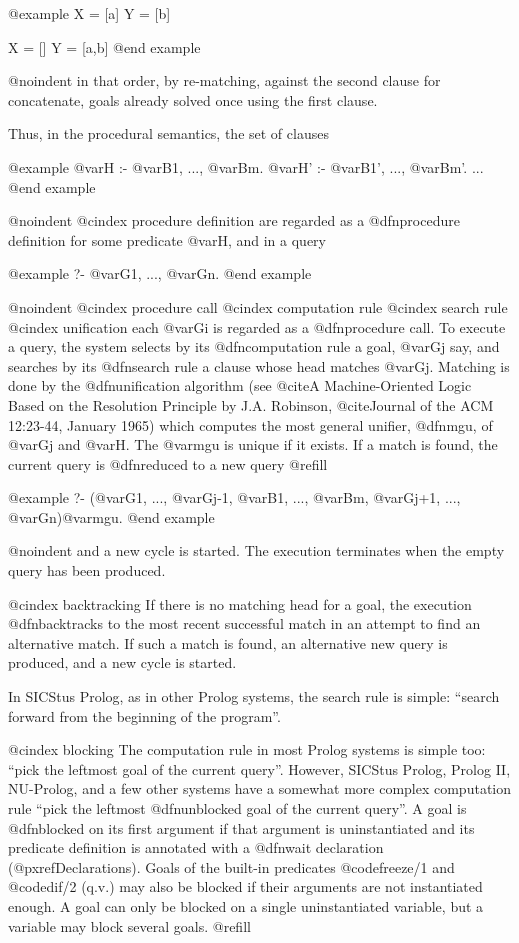{@example
X = [a]
Y = [b]

X = []
Y = [a,b]
@end example

@noindent
in that order, by re-matching, against the second clause for concatenate,
goals already solved once using the first clause.

Thus, in the procedural semantics, the set of clauses

@example
@var{H} :- @var{B1}, ..., @var{Bm}.
@var{H'} :- @var{B1'}, ..., @var{Bm'}.
...
@end example

@noindent
@cindex procedure definition
are regarded as a @dfn{procedure definition} for some predicate @var{H},
and in a query

@example
?- @var{G1}, ..., @var{Gn}.
@end example

@noindent
@cindex procedure call
@cindex computation rule
@cindex search rule
@cindex unification
each @var{Gi} is regarded as a @dfn{procedure call}.  To execute a
query, the system selects by its @dfn{computation rule} a goal, @var{Gj}
say, and searches by its @dfn{search rule} a clause whose head matches
@var{Gj}.  Matching is done by the @dfn{unification} algorithm (see
@cite{A Machine-Oriented Logic Based on the Resolution Principle} by
J.A. Robinson, @cite{Journal of the ACM} 12:23-44, January 1965) which
computes the most general unifier, @dfn{mgu}, of @var{Gj} and @var{H}.
The @var{mgu} is unique if it exists.  If a match is found, the current
query is @dfn{reduced} to a new query @refill

@example
?- (@var{G1}, ..., @var{Gj-1}, @var{B1}, ..., @var{Bm}, @var{Gj+1}, ..., @var{Gn})@var{mgu}.
@end example

@noindent
and a new cycle is started.  The execution terminates when the empty
query has been produced.

@cindex backtracking
If there is no matching head for a goal, the execution @dfn{backtracks}
to the most recent successful match in an attempt to find an alternative
match.  If such a match is found, an alternative new query is produced,
and a new cycle is started.

In SICStus Prolog, as in other Prolog systems, the search rule is
simple: ``search forward from the beginning of the program''.  

@cindex blocking
The computation rule in most Prolog systems is simple too: ``pick the
leftmost goal of the current query''.  However, SICStus Prolog, Prolog
II, NU-Prolog, and a few other systems have a somewhat more complex
computation rule ``pick the leftmost @dfn{unblocked} goal of the current
query''.  A goal is @dfn{blocked on its first argument} if that argument
is uninstantiated and its predicate definition is annotated with a
@dfn{wait declaration} (@pxref{Declarations}).  Goals of the built-in
predicates @code{freeze/1} and @code{dif/2} (q.v.) may also be blocked
if their arguments are not instantiated enough.  A goal can only be
blocked on a single uninstantiated variable, but a variable may block
several goals. @refill

}
